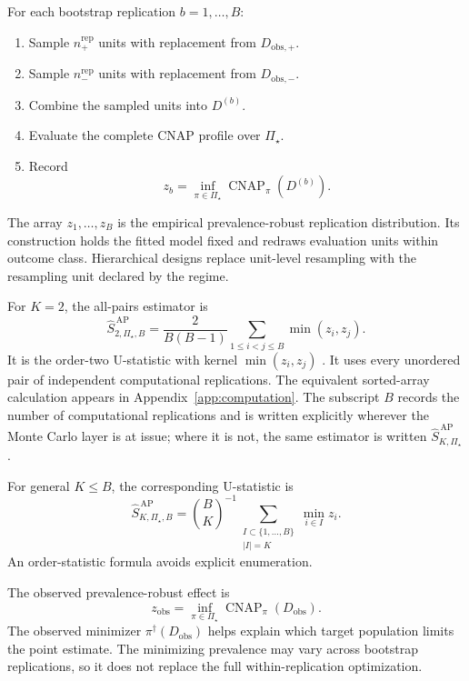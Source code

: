 \documentclass[11pt]{article}
\newcommand{\CNAP}{\operatorname{CNAP}}
\newcommand{\PSet}{\Pi_\star}
\newcommand{\SRobHat}{\widehat S_{K,\PSet}^{\,\mathrm{AP}}}
\theoremstyle{remark}
\begin{document}
For each bootstrap replication $b=1,\ldots,B$:
\begin{enumerate}
\item Sample $n_+^{\mathrm{rep}}$ units with replacement from $D_{\mathrm{obs},+}$.
\item Sample $n_-^{\mathrm{rep}}$ units with replacement from $D_{\mathrm{obs},-}$.
\item Combine the sampled units into $D^{(b)}$.
\item Evaluate the complete CNAP profile over $\PSet$.
\item Record
\begin{equation}
z_b
=
\inf_{\pi\in\PSet}
\CNAP_\pi(D^{(b)}).
\label{eq:bootstrap-robust-effect}
\end{equation}
\end{enumerate}

The array $z_1,\ldots,z_B$ is the empirical prevalence-robust replication distribution. Its construction holds the fitted model fixed and redraws evaluation units within outcome class. Hierarchical designs replace unit-level resampling with the resampling unit declared by the regime.

For $K=2$, the all-pairs estimator is
\begin{equation}
\widehat S_{2,\PSet,B}^{\,\mathrm{AP}}
=
\frac{2}{B(B-1)}
\sum_{1\leq i<j\leq B}
\min(z_i,z_j).
\label{eq:all-pairs-estimator}
\end{equation}
It is the order-two U-statistic with kernel $\min(z_i,z_j)$ \cite{hoeffding1948ustat}. It uses every unordered pair of independent computational replications. The equivalent sorted-array calculation appears in Appendix~\ref{app:computation}. The subscript $B$ records the number of computational replications and is written explicitly wherever the Monte Carlo layer is at issue; where it is not, the same estimator is written $\SRobHat$.

For general $K\leq B$, the corresponding U-statistic is
\begin{equation}
\widehat S_{K,\PSet,B}^{\,\mathrm{AP}}
=
\binom{B}{K}^{-1}
\sum_{\substack{I\subset\{1,\ldots,B\}\\|I|=K}}
\min_{i\in I}z_i.
\label{eq:general-u-statistic}
\end{equation}
An order-statistic formula avoids explicit enumeration.

The observed prevalence-robust effect is
\[
z_{\mathrm{obs}}
=
\inf_{\pi\in\PSet}
\CNAP_\pi(D_{\mathrm{obs}}).
\]
The observed minimizer $\pi^\dagger(D_{\mathrm{obs}})$ helps explain which target population limits the point estimate. The minimizing prevalence may vary across bootstrap replications, so it does not replace the full within-replication optimization.
\end{document}
